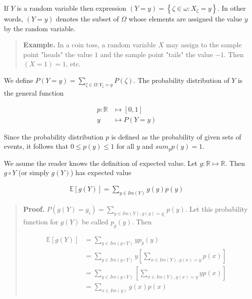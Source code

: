 \documentclass[a4paper, 12pt]{article}
\begin{document}
If $Y$ is a random variable then expression $(Y = y) = \left\{ \zeta \in \omega
: X_{\zeta} = y \right\} $. In other words, $(Y = y)$ denotes the subset of
$\Omega$ whose elements are assigned the value $y$ by the random variable.


\small
\begin{quote}

\textbf{Example.} In a coin toss, a random variable $X$ may assign to the sample
point "heads" the value $1$ and the sample point "tails" the value $-1$. Then
$(X = 1) = 1$, etc.

\end{quote}
\normalsize

We define $P(Y = y) = \sum_{\zeta \in \Omega : Y_{\zeta} = y} P(\zeta)$. The
probability distribution of $Y$ is the general function  

\begin{align*}
    p : \mathbb{R} &\mapsto [0, 1] \\ 
    y &\mapsto P(Y = y)
\end{align*}

Since the probability distribution $p$ is defined as the probability of given
sets of events, it follows that $0 \leq p(y) \leq 1$ for all $y$ and
$sum_{y}p(y) = 1$.

We asume the reader knows the definition of expected value. Let $g : \mathbb{R}
\mapsto \mathbb{R}$. Then $g \circ Y$ (or simply $g(Y)$) has expected value 

\begin{align*}
    \mathbb{E}\left[ g(Y) \right] = \sum_{y \in Im(Y)} g(y)p(y)
\end{align*}


\small
\begin{quote}

    \textbf{Proof.} $P(g(Y) = g_i) = \sum_{y \in Im(Y), g(y) = g_i} p(y)$. Let
    this probability function for $g(Y)$ be called $p_g(y)$. Then 

    \begin{align*}
        \mathbb{E}[g(Y)] &= \sum_{y \in Im(g \circ Y)} y p_g(y) \\ 
                         &= \sum_{y \in Im(g \circ Y)} y \left[ \sum_{x \in
                         Im(Y), g(x)= y} p(x) \right] \\ 
                         &= \sum_{y \in Im(g \circ Y)}  \left[ \sum_{x \in
                         Im(Y), g(x)= y} y p(x) \right] \\ 
                         &= \sum_{x \in Im(y)} g(x)p(x)
    \end{align*}

\end{quote}
\normalsize
\end{document}
